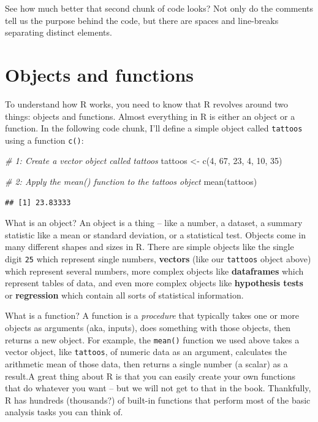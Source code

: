 \documentclass[
]{book}
\newenvironment{Shaded}{\begin{snugshade}}{\end{snugshade}}
\newcommand{\CommentTok}[1]{\textcolor[rgb]{0.56,0.35,0.01}{\textit{#1}}}
\newcommand{\DecValTok}[1]{\textcolor[rgb]{0.00,0.00,0.81}{#1}}
\newcommand{\FunctionTok}[1]{\textcolor[rgb]{0.00,0.00,0.00}{#1}}
\newcommand{\NormalTok}[1]{#1}
\newcommand{\OtherTok}[1]{\textcolor[rgb]{0.56,0.35,0.01}{#1}}
\begin{document}
See how much better that second chunk of code looks? Not only do the comments tell us the purpose behind the code, but there are spaces and line-breaks separating distinct elements.

\hypertarget{objects-and-functions}{%
\section{Objects and functions}\label{objects-and-functions}}

To understand how R works, you need to know that R revolves around two things: objects and functions. Almost everything in R is either an object or a function. In the following code chunk, I'll define a simple object called \texttt{tattoos} using a function \texttt{c()}:

\begin{Shaded}
\begin{Highlighting}[]
\CommentTok{\# 1: Create a vector object called tattoos}
\NormalTok{tattoos }\OtherTok{\textless{}{-}} \FunctionTok{c}\NormalTok{(}\DecValTok{4}\NormalTok{, }\DecValTok{67}\NormalTok{, }\DecValTok{23}\NormalTok{, }\DecValTok{4}\NormalTok{, }\DecValTok{10}\NormalTok{, }\DecValTok{35}\NormalTok{)}

\CommentTok{\# 2: Apply the mean() function to the tattoos object}
\FunctionTok{mean}\NormalTok{(tattoos)}
\end{Highlighting}
\end{Shaded}

\begin{verbatim}
## [1] 23.83333
\end{verbatim}

What is an object? An object is a thing -- like a number, a dataset, a summary statistic like a mean or standard deviation, or a statistical test. Objects come in many different shapes and sizes in R. There are simple objects like the single digit \texttt{25} which represent single numbers, \textbf{vectors} (like our \texttt{tattoos} object above) which represent several numbers, more complex objects like \textbf{dataframes} which represent tables of data, and even more complex objects like \textbf{hypothesis tests} or \textbf{regression} which contain all sorts of statistical information.

What is a function? A function is a \emph{procedure} that typically takes one or more objects as arguments (aka, inputs), does something with those objects, then returns a new object. For example, the \texttt{mean()} function we used above takes a vector object, like \texttt{tattoos}, of numeric data as an argument, calculates the arithmetic mean of those data, then returns a single number (a scalar) as a result.A great thing about R is that you can easily create your own functions that do whatever you want -- but we will not get to that in the book. Thankfully, R has hundreds (thousands?) of built-in functions that perform most of the basic analysis tasks you can think of.
\end{document}
